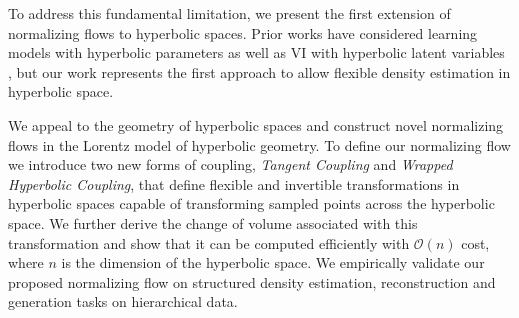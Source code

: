 

To address this fundamental limitation, we present the first extension of normalizing flows to hyperbolic spaces. 
Prior works have considered learning models with hyperbolic parameters  \cite{liu2019hyperbolic,nickel2018learning} as well as VI with hyperbolic latent variables \cite{nagano2019wrapped,mathieu2019continuous}, but our work represents the first approach to allow flexible density estimation in hyperbolic space. 

We appeal to the geometry of hyperbolic spaces and construct novel normalizing flows in the Lorentz model of hyperbolic geometry. 
To define our normalizing flow we introduce two new forms of coupling, {\em Tangent Coupling} and {\em Wrapped Hyperbolic Coupling}, that define flexible and invertible transformations in hyperbolic spaces capable of transforming sampled points across the hyperbolic space. 
We further derive the change of volume associated with this transformation and show that it can be computed efficiently with $\mathcal{O}(n)$ cost, where $n$ is the dimension of the hyperbolic space.
We empirically validate our proposed normalizing flow on structured density estimation, reconstruction and generation tasks on hierarchical data. 

